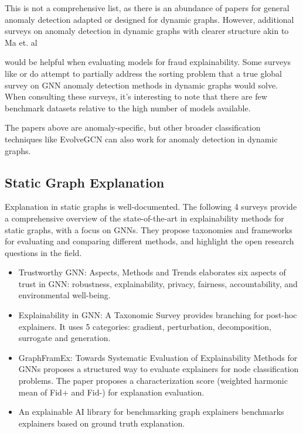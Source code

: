 This is not a comprehensive list, as there is an abundance of papers for general anomaly detection adapted or designed for dynamic graphs. However, additional surveys on anomaly detection in dynamic graphs with clearer structure akin to Ma et. al{\cite{ma_comprehensive_2021} would be helpful when evaluating models for fraud explainability. Some surveys like \cite{kim_graph_2022} or \cite{lindemann_survey_2021} do attempt to partially address the sorting problem that a true global survey on GNN anomaly detection methods in dynamic graphs would solve. When consulting these surveys, it's interesting to note that there are few benchmark datasets relative to the high number of models available.

The papers above are anomaly-specific, but other broader classification techniques like EvolveGCN\cite{pareja_evolvegcn_2019} can also work for anomaly detection in dynamic graphs.

\subsection{Static Graph Explanation}
Explanation in static graphs is well-documented. The following 4 surveys provide a comprehensive overview of the state-of-the-art in explainability methods for static graphs, with a focus on GNNs. They propose taxonomies and frameworks for evaluating and comparing different methods, and highlight the open research questions in the field.

\begin{itemize}
    \item Trustworthy GNN: Aspects, Methods and Trends\cite{zhang_trustworthy_2022} elaborates six aspects of trust in GNN: robustness, explainability, privacy, fairness, accountability, and environmental well-being.
    \item Explainability in GNN: A Taxonomic Survey\cite{yuan_explainability_2023} provides branching for post-hoc explainers. It uses 5 categories: gradient, perturbation, decomposition, surrogate and generation.
    \item GraphFramEx: Towards Systematic Evaluation of Explainability Methods for GNNs\cite{amara_graphframex_2022} proposes a structured way to evaluate explainers for node classification problems. The paper proposes a characterization score (weighted harmonic mean of Fid+ and Fid-) for explanation evaluation.
    \item An explainable AI library for benchmarking graph explainers\cite{agarwal_explainable_2022} benchmarks explainers based on ground truth explanation.
\end{itemize} 

}

